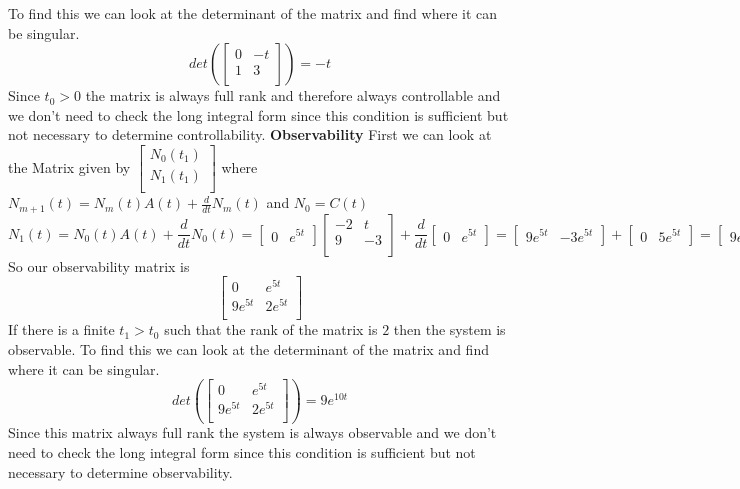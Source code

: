 \documentclass{article}
\begin{document}
To find this we can look at the determinant of the matrix and find where it can be singular.
$$
det(
\begin{bmatrix}
0 & -t \\
1 & 3 \\
\end{bmatrix}
) = -t
$$
Since $ t_0 > 0 $ the matrix is always full rank and therefore always controllable and we don't need to check the long integral form since this condition is sufficient but not necessary to determine controllability.
\newline
\textbf{Observability}
\newline
First we can look at the Matrix given by
$
\begin{bmatrix}
N_0(t_1) \\
N_1(t_1) \\
\end{bmatrix}
$
where $N_{m+1}(t) = N_m(t)A(t) + \frac{d}{dt}N_m(t)$ and $N_0 = C(t)$
$$
N_1(t) = N_0(t)A(t) + \frac{d}{dt}N_0(t) =
\begin{bmatrix} 0 & e^{5t} \end{bmatrix}
\begin{bmatrix}
-2 & t  \\
9  & -3 \\
\end{bmatrix}
+ \frac{d}{dt}
\begin{bmatrix} 0 & e^{5t} \end{bmatrix}
=
\begin{bmatrix} 9e^{5t} & -3e^{5t} \end{bmatrix}
+
\begin{bmatrix} 0 & 5e^{5t} \end{bmatrix}
=
\begin{bmatrix} 9e^{5t} & 2e^{5t} \end{bmatrix}
$$
So our observability matrix is
$$
\begin{bmatrix}
0 & e^{5t} \\
9e^{5t} & 2e^{5t} \\
\end{bmatrix}
$$
If there is a finite $t_1>t_0$ such that the rank of the matrix is $2$ then the system is observable.
To find this we can look at the determinant of the matrix and find where it can be singular.
$$
det(
\begin{bmatrix}
0 & e^{5t} \\
9e^{5t} & 2e^{5t} \\
\end{bmatrix}
) = 9e^{10t}
$$
Since this matrix always full rank the system is always observable and we don't need to check the long integral form since this condition is sufficient but not necessary to determine observability.
\end{document}
